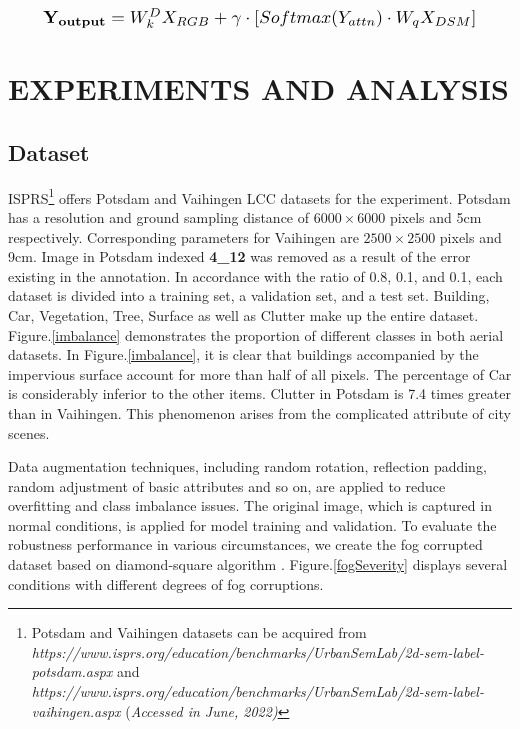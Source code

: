 \documentclass[lettersize,journal]{IEEEtran}
\begin{document}
    \begin{equation}
        \resizebox{0.9\hsize}{!}{$
        \mathbf{Y_{output}} =W_k^{D} X_{RGB} + \gamma \cdot [Softmax(Y_{attn})\cdot W_{q}X_{DSM} ] $}
        \label{eqCMFM}
    \end{equation}

\section{EXPERIMENTS AND ANALYSIS}
\subsection{Dataset}\label{sec:dataset}
ISPRS\footnote{Potsdam and Vaihingen datasets can be acquired from \emph{https://www.isprs.org/education/benchmarks/UrbanSemLab/2d-sem-label-potsdam.aspx} and \emph{https://www.isprs.org/education/benchmarks/UrbanSemLab/2d-sem-label-vaihingen.aspx} (\emph{{Accessed in June, 2022})}} offers Potsdam and Vaihingen LCC datasets for the experiment. Potsdam has a resolution and ground sampling distance of $6000\times 6000$ pixels and 5cm respectively.
Corresponding parameters for Vaihingen are $2500\times 2500$ pixels and 9cm. Image in Potsdam indexed \textbf{4\_12} was removed as a result of the error existing in the annotation. In accordance with the ratio of 0.8, 0.1, and 0.1, each dataset is divided into a training set, a validation set, and a test set.
Building, Car, Vegetation, Tree, Surface as well as Clutter make up the entire dataset. Figure.\ref{imbalance} demonstrates the proportion of different classes in both aerial datasets. In Figure.\ref{imbalance}, it is clear that buildings accompanied by the impervious surface account for more than half of all pixels. The percentage of Car is considerably inferior to the other items. Clutter in Potsdam is 7.4 times greater than in Vaihingen. This phenomenon arises from the complicated attribute of city scenes.

Data augmentation techniques, including random rotation, reflection padding, random adjustment of basic attributes and so on, are applied to reduce overfitting and class imbalance issues. The original image, which is captured in normal conditions, is applied for model training and validation. To evaluate the robustness performance in various circumstances, we create the fog corrupted dataset based on diamond-square algorithm \cite{kamannBenchmarkingRobustnessSemantic2021}. Figure.\ref{fogSeverity} displays several conditions with different degrees of fog corruptions.
\end{document}

